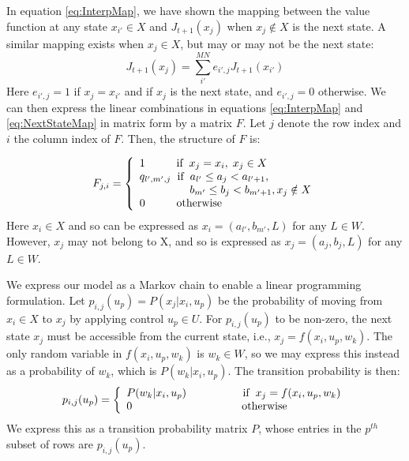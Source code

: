 \documentclass[conference]{IEEEtran}
\begin{document}
In equation \eqref{eq:InterpMap}, we have shown the mapping between the value function at any state $x_{i'}\in X$ and $J_{t+1}(x_{j})$ when $x_{j}\not\in X$ is the next state. A similar mapping exists when $x_{j}\in X$, but may or may not be the next state:
\begin{equation} \label{eq:NextStateMap}
	J_{t+1}(x_{j})=\sum_{i'}^{MN}e_{i',j}J_{t+1}(x_{i'})
\end{equation} Here $e_{i',j}=1$ if $x_{j}=x_{i'}$ and if $x_{j}$ is the next state, and $e_{i',j}=0$ otherwise. We can then express the linear combinations in equations \eqref{eq:InterpMap} and \eqref{eq:NextStateMap} in matrix form by a matrix $F$. Let $j$ denote the row index and $i$ the column index of $F$. Then, the structure of $F$ is:

\begin{displaymath}
F_{j,i}=
\left\{
\begin{array}{l}
1		   \hspace{1cm} \text{if} \hspace{0.2cm}x_{j}=x_{i}, \hspace{0.1cm}x_{j}\in X\\
q_{l',m',j}\hspace{0.2cm} \text{if} \hspace{0.2cm} a_{l'}\leq a_{j}< a_{l'+1},\\
\hspace{1.6cm} b_{m'}\leq b_{j}< b_{m'+1}, x_{j}\notin X\\
0		   \hspace{1cm} \text{otherwise}
\end{array}
\right.
\end{displaymath} Here $x_{i}\in X$ and so can be expressed as $x_{i}=(a_{l'},b_{m'},L)$ for any $L\in W$. However, $x_{j}$ may not belong to X, and so is expressed as $x_{j}=(a_{j},b_{j},L)$ for any $L\in W$.

We express our model as a Markov chain to enable a linear programming formulation. Let $p_{i,j}(u_{p})=P(x_{j}| x_{i},u_{p})$ be the probability of moving from $x_{i}\in X$ to $x_{j}$ by applying control $u_{p}\in U$. For $p_{i,j}(u_{p})$ to be non-zero, the next state $x_{j}$ must be accessible from the current state, i.e., $x_{j}=f(x_{i},u_{p},w_{k})$. The only random variable in $f(x_{i},u_{p},w_{k})$ is $w_{k}\in W$, so we may express this instead as a probability of $w_{k}$, which is $P(w_{k} | x_{i},u_{p})$. The transition probability is then:
\begin{equation} \label{eq:TransMtx}
p_{i,j}(u_{p})=
\left\{
\begin{array}{l}
P(w_{k}|x_{i},u_{p}) \hspace{1.8cm} \text{if} \hspace{0.2cm} x_{j}=f(x_{i},u_{p},w_{k})\\
0 \hspace{3.5cm} \text{otherwise}
\end{array}
\right.
\end{equation} We express this as a transition probability matrix $P$, whose entries in the $p^{th}$ subset of rows are $p_{i,j}(u_{p})$.  
\end{document}
